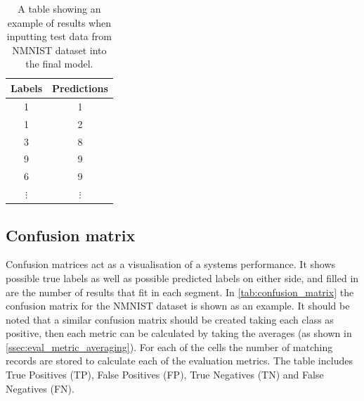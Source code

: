 \begin{table}[htb]
    \centering
    \begin{tabular}{|| c  | c ||}
        \hline
        Labels     & Predictions \\
        \hline \hline
        1          & 1           \\
        \hline
        1          & 2           \\
        \hline
        3          & 8           \\
        \hline
        9          & 9           \\
        \hline
        6          & 9           \\
        \hline
        $ \vdots $ & $ \vdots $  \\
    \end{tabular}
    \caption{A table showing an example of results when inputting test data from NMNIST dataset\cite{NMNIST} into the final model.}
    \label{tab:possible_results}
\end{table}

\subsection{Confusion matrix}

Confusion matrices act as a visualisation of a systems performance. It shows possible true labels as well as possible predicted labels on either side, and filled in are the number of results that fit in each segment. In \cref{tab:confusion_matrix} the confusion matrix for the NMNIST dataset is shown as an example. It should be noted that a similar confusion matrix should be created taking each class as positive, then each metric can be calculated by taking the averages (as shown in \cref{ssec:eval_metric_averaging}). For each of the cells the number of matching records are stored to calculate each of the evaluation metrics. The table includes True Positives (TP), False Positives (FP), True Negatives (TN) and False Negatives (FN).

